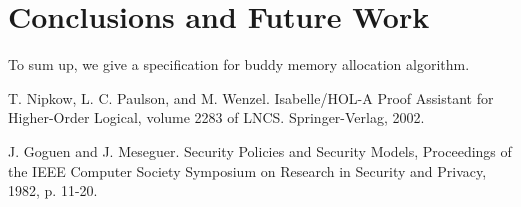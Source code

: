 \documentclass[runningheads]{llncs}
\begin{document}
\section{Conclusions and Future Work}
To sum up, we give a specification for buddy memory allocation algorithm. 

\begin{thebibliography}{8}
T. Nipkow, L. C. Paulson, and M. Wenzel. Isabelle/HOL-A Proof Assistant for Higher-Order Logical, volume 2283 of LNCS. Springer-Verlag, 2002.

J. Goguen and J. Meseguer. Security Policies and Security Models, Proceedings of the IEEE Computer Society Symposium on Research in Security and Privacy, 1982, p. 11-20.


\end{thebibliography}
\end{document}
